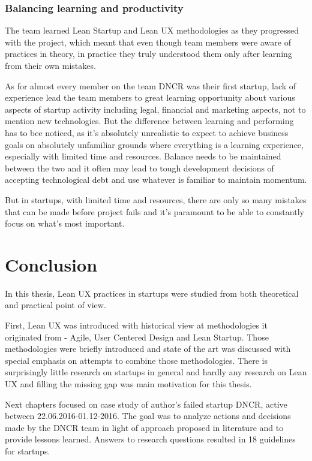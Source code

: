 \documentclass{article}
\begin{document}
\subsubsection{Balancing learning and productivity}
The team learned Lean Startup and Lean UX methodologies as they progressed with the project, which meant that even though team members were aware of practices in theory, in practice they truly understood them only after learning from their own mistakes.

As for almost every member on the team DNCR was their first startup, lack of experience lead the team members to great learning opportunity about various aspects of startup activity including legal, financial and marketing aspects, not to mention new technologies. But the difference between learning and performing has to bee noticed, as it's absolutely unrealistic to expect to achieve business goals on absolutely unfamiliar grounds where everything is a learning experience, especially with limited time and resources. Balance needs to be maintained between the two and it often may lead to tough development decisions of accepting technological debt and use whatever is familiar to maintain momentum.

But in startups, with limited time and resources, there are only so many mistakes that can be made before project fails and it's paramount to be able to constantly focus on what's most important.

\section{Conclusion}
In this thesis, Lean UX practices in startups were studied from both theoretical and practical point of view.

First, Lean UX was introduced with historical view at methodologies it originated from - Agile, User Centered Design and Lean Startup. Those methodologies were briefly introduced and state of the art was discussed with special emphasis on attempts to combine those methodologies. There is surprisingly little research on startups in general and hardly any research on Lean UX and filling the missing gap was main motivation for this thesis.

Next chapters focused on case study of author's failed startup DNCR, active between 22.06.2016-01.12-2016. The goal was to analyze actions and decisions made by the DNCR team in light of approach proposed in literature and to provide lessons learned. Answers to research questions resulted in 18 guidelines for startups.
\end{document}
